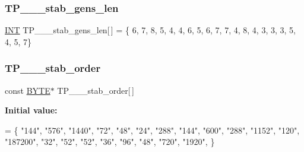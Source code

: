 \subsubsection{\texorpdfstring{T\+P\+\_\+\_\+\_\+stab\+\_\+gens\+\_\+len}{TP\_5\_2\_stab\_gens\_len}}
{\footnotesize\ttfamily \mbox{\hyperlink{galois_8h_a09fddde158a3a20bd2dcadb609de11dc}{I\+NT}} T\+P\+\_\+\_\+\_\+stab\+\_\+gens\+\_\+len\mbox{[}$\,$\mbox{]} = \{ 6, 7, 8, 5, 4, 4, 6, 5, 6, 7, 7, 4, 8, 4, 3, 3, 3, 5, 4, 5, 7\}}

\mbox{\label{data___t_p_8_c_aa2ab4d4376369ac6dac042d3f99cd282}} 
\subsubsection{\texorpdfstring{T\+P\+\_\+\_\+\_\+stab\+\_\+order}{TP\_5\_2\_stab\_order}}
{\footnotesize\ttfamily const \mbox{\hyperlink{galois_8h_ab6cc7b4aeb6ea31aba2b3fbfc83ff5e6}{B\+Y\+TE}}$\ast$ T\+P\+\_\+\_\+\_\+stab\+\_\+order\mbox{[}$\,$\mbox{]}}

{\bfseries Initial value\+:}
\begin{DoxyCode}
= \{
\textcolor{stringliteral}{"144"},
\textcolor{stringliteral}{"576"},
\textcolor{stringliteral}{"1440"},
\textcolor{stringliteral}{"72"},
\textcolor{stringliteral}{"48"},
\textcolor{stringliteral}{"24"},
\textcolor{stringliteral}{"288"},
\textcolor{stringliteral}{"144"},
\textcolor{stringliteral}{"600"},
\textcolor{stringliteral}{"288"},
\textcolor{stringliteral}{"1152"},
\textcolor{stringliteral}{"120"},
\textcolor{stringliteral}{"187200"},
\textcolor{stringliteral}{"32"},
\textcolor{stringliteral}{"52"},
\textcolor{stringliteral}{"52"},
\textcolor{stringliteral}{"36"},
\textcolor{stringliteral}{"96"},
\textcolor{stringliteral}{"48"},
\textcolor{stringliteral}{"720"},
\textcolor{stringliteral}{"1920"},
\}
\end{DoxyCode}
